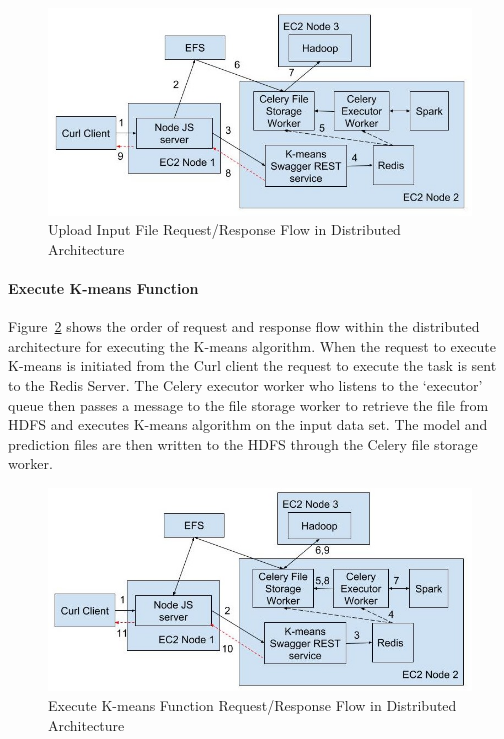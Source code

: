 \begin{figure}[htbp] 
	\centering
	\includegraphics[width=\columnwidth]{images/ec2uploadipfile.jpg}
	\caption{Upload Input File Request/Response Flow in Distributed 
	Architecture}
\label{fig:uploadipfiledistributed} 
\end{figure}

\paragraph{Execute K-means Function}

Figure~\ref{fig:executekmeansdistributed} shows the order of request and 
response flow within the distributed architecture for executing the K-means 
algorithm. When the request to execute K-means is initiated from the Curl 
client the request to execute the task is sent to the Redis Server. The Celery 
executor worker who listens to the `executor' queue then passes a message to 
the file storage worker to retrieve the file from HDFS and executes K-means 
algorithm on the input data set. The model and prediction files are then 
written to the HDFS through the Celery file storage worker.

\begin{figure}[htbp] 
	\centering
	\includegraphics[width=\columnwidth]{images/ec2executekmeans.jpg}
	\caption{Execute K-means Function Request/Response Flow in Distributed 
	Architecture}
\label{fig:executekmeansdistributed} 
\end{figure}


